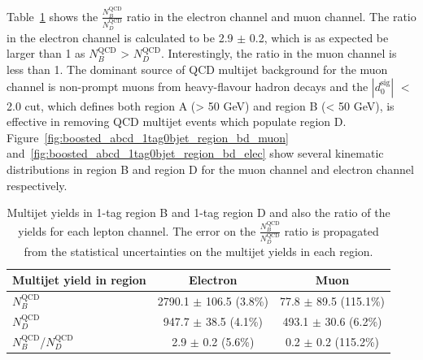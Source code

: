Table~\ref{tab:boosted_bkgd_1tag0bjet_abcd_ratio} shows the $\frac{N_B^\text{QCD}}{N_D^\text{QCD}}$ ratio in the electron channel and muon channel. 
The ratio in the electron channel is calculated to be 2.9 $\pm$ 0.2, which is as expected be larger than 1 as $N_B^\text{QCD}$ > $N_D^\text{QCD}$.
Interestingly, the ratio in the muon channel is less than 1. The dominant source of QCD multijet background for the muon channel is non-prompt muons 
from heavy-flavour hadron decays and the $|d_{0}^{\textrm{sig}}|$ $<$ 2.0 cut, which defines both region A (\met > 50 GeV) and region B (\met < 50 GeV), 
is effective in removing QCD multijet events which populate region D. Figure~\ref{fig:boosted_abcd_1tag0bjet_region_bd_muon} 
and~\ref{fig:boosted_abcd_1tag0bjet_region_bd_elec} show several kinematic distributions in region B and region D for the muon 
channel and electron channel respectively.

\begin{table}[!htbp]
\begin{center}
\begin{tabular}{l|c|c}
Multijet yield in region                & Electron                   & Muon \\        
\hline
$N_B^\text{QCD}$                        & 2790.1 $\pm$ 106.5 (3.8\%) & 77.8  $\pm$ 89.5 (115.1\%) \\
$N_D^\text{QCD}$                        & 947.7  $\pm$ 38.5 (4.1\%)  & 493.1 $\pm$ 30.6 (6.2\%)   \\
\hline
$N_{B}^\text{QCD}$/$N_{D}^\text{QCD}$   & 2.9   $\pm$ 0.2 (5.6\%)    & 0.2   $\pm$ 0.2 (115.2\%)  \\
\end{tabular}
\end{center}
\caption{Multijet yields in 1-tag region B and 1-tag region D and also the ratio of the yields for each lepton channel. 
The error on the $\frac{N_B^\text{QCD}}{N_D^\text{QCD}}$ ratio is propagated from the statistical uncertainties 
on the multijet yields in each region.}
\label{tab:boosted_bkgd_1tag0bjet_abcd_ratio}
\end{table}

